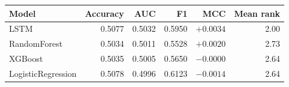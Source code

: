 \begin{tabular}{lrrrrr}
\toprule
Model & Accuracy & AUC & F1 & MCC & Mean rank \\
\midrule
LSTM & 0.5077 & 0.5032 & 0.5950 & $+0.0034$ & 2.00 \\
RandomForest & 0.5034 & 0.5011 & 0.5528 & $+0.0020$ & 2.73 \\
XGBoost & 0.5035 & 0.5005 & 0.5650 & $-0.0000$ & 2.64 \\
LogisticRegression & 0.5078 & 0.4996 & 0.6123 & $-0.0014$ & 2.64 \\
\bottomrule
\end{tabular}
